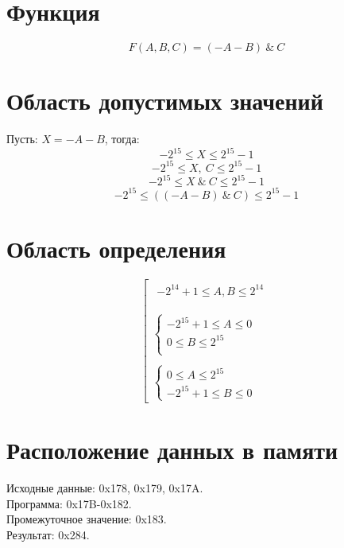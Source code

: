 \documentclass{article}
\begin{document}
\section{Функция}

$$ 
      F(A, B, C) = (-A -B)\ \&\ C 
$$
\section{Область допустимых значений}
Пусть: $ X = -A -B $, тогда:
$$ -2^{15} \le X \le 2^{15} - 1 $$
$$ -2^{15} \le X,\ C \le 2^{15} - 1 $$
$$ -2^{15} \le X\ \&\ C \le 2^{15} - 1 $$
$$ -2^{15} \le ((-A -B)\ \&\ C) \le 2^{15} - 1 $$




\section{Область определения}
$$
      \left[{ \begin{array}{l}
                        \begin{array}{l} -2^{14}+1 \le A,B \le 2^{14} \\
                        \end{array} \\
                        \\
                        \left\{ \begin{array}{l}
                                      -2^{15}+1 \le A   \le 0 \\
                                      0 \le B   \le 2^{15}    \\
                                \end{array}\right.               \\
                        \\
                        \left\{ \begin{array}{l}
                                      0 \le A   \le 2^{15} \\
                                      -2^{15}+1 \le B   \le 0
                                \end{array}\right.
                  \end{array}}\right.
$$

\section{Расположение данных в памяти}
Исходные данные: 0x178, 0x179, 0x17A. \\
Программа: 0x17B-0x182. \\
Промежуточное значение: 0x183. \\
Результат: 0x284. \\
\end{document}
